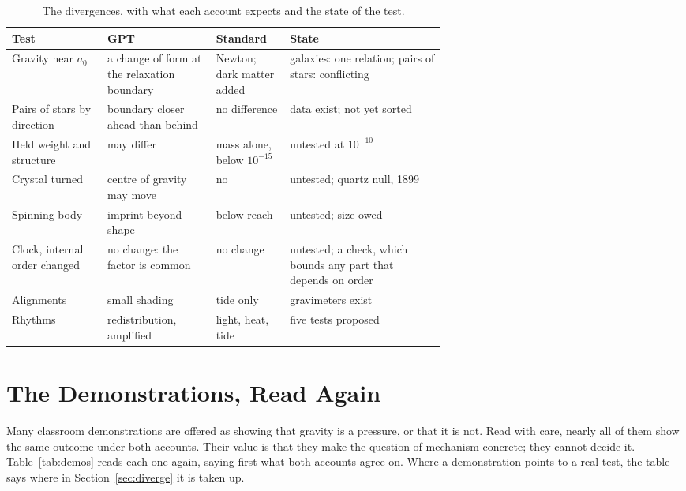 \documentclass[11pt,a4paper]{article}
\begin{document}
\begin{table}[t]\centering\small
\caption{The divergences, with what each account expects and the state of the test.}
\begin{tabularx}{\linewidth}{@{}>{\raggedright\arraybackslash}p{0.22\linewidth} >{\raggedright\arraybackslash}p{0.25\linewidth} >{\raggedright\arraybackslash}p{0.17\linewidth} >{\raggedright\arraybackslash}X@{}}\toprule
\textbf{Test} & \textbf{GPT} & \textbf{Standard} & \textbf{State}\\\midrule
Gravity near $a_0$ & a change of form at the relaxation boundary & Newton; dark matter added & galaxies: one relation; pairs of stars: conflicting\\
Pairs of stars by direction & boundary closer ahead than behind & no difference & data exist; not yet sorted\\
Held weight and structure & may differ & mass alone, below $10^{-15}$ & untested at $10^{-10}$\\
Crystal turned & centre of gravity may move & no & untested; quartz null, 1899\\
Spinning body & imprint beyond shape & below reach & untested; size owed\\
Clock, internal order changed & no change: the factor is common & no change & untested; a check, which bounds any part that depends on order\\
Alignments & small shading & tide only & gravimeters exist\\
Rhythms & redistribution, amplified & light, heat, tide & five tests proposed\\\bottomrule
\end{tabularx}\label{tab:tests}\end{table}

\section{The Demonstrations, Read Again}\label{sec:demos}

Many classroom demonstrations are offered as showing that gravity is a pressure, or that it is not. Read with care, nearly all of them show the same outcome under both accounts. Their value is that they make the question of mechanism concrete; they cannot decide it. Table~\ref{tab:demos} reads each one again, saying first what both accounts agree on. Where a demonstration points to a real test, the table says where in Section~\ref{sec:diverge} it is taken up.\nocite{rashadaPart6,rashadaPart7,rashadaPart11,rashadaPart22}
\end{document}
